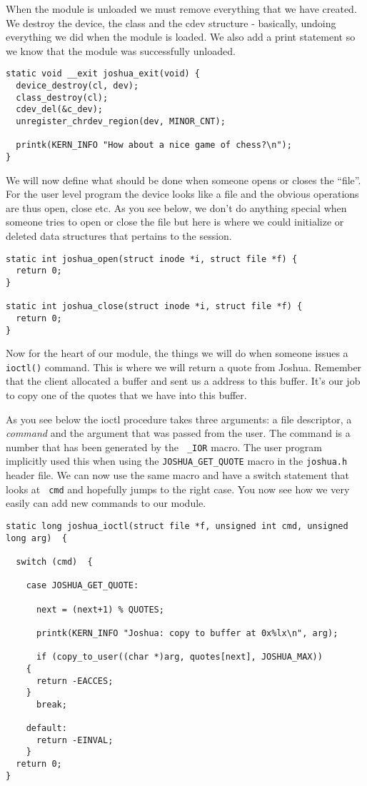 \documentclass[a4paper,11pt]{article}
\begin{document}
When the module is unloaded we must remove everything that we have
created. We destroy the device, the class and the cdev structure -
basically, undoing everything we did when the module is loaded. We
also add a print statement so we know that the module was successfully
unloaded.

\begin{lstlisting}
static void __exit joshua_exit(void) {
  device_destroy(cl, dev);
  class_destroy(cl);
  cdev_del(&c_dev);
  unregister_chrdev_region(dev, MINOR_CNT);
    
  printk(KERN_INFO "How about a nice game of chess?\n");
}
\end{lstlisting}

We will now define what should be done when someone opens or closes
the ``file''. For the user level program the device looks like a file
and the obvious operations are thus open, close etc. As you see below,
we don't do anything special when someone tries to open or close the
file but here is where we could initialize or deleted data structures
that pertains to the session.

\begin{lstlisting}
static int joshua_open(struct inode *i, struct file *f) {
  return 0;
}

static int joshua_close(struct inode *i, struct file *f) {
  return 0;
}
\end{lstlisting}

Now for the heart of our module, the things we will do when someone
issues a {\tt ioctl()} command. This is where we will return a quote
from Joshua. Remember that the client allocated a buffer and sent us a
address to this buffer. It's our job to copy one of the quotes that
we have into this buffer.

As you see below the ioctl procedure takes three arguments: a file
descriptor, a {\em command} and the argument that was passed from the
user. The command is a number that has been generated by the {\tt
 \_IOR} macro. The user program implicitly used this when using the
{\tt JOSHUA\_GET\_QUOTE} macro in the {\tt joshua.h} header file. We can
now use the same macro and have a switch statement that looks at {\tt
  cmd} and hopefully jumps to the right case. You now see how we very
easily can add new commands to our module.

\begin{lstlisting}
static long joshua_ioctl(struct file *f, unsigned int cmd, unsigned long arg)  {

  switch (cmd)  {

    case JOSHUA_GET_QUOTE:

      next = (next+1) % QUOTES;

      printk(KERN_INFO "Joshua: copy to buffer at 0x%lx\n", arg);
     
      if (copy_to_user((char *)arg, quotes[next], JOSHUA_MAX))
	{
	  return -EACCES;
	}
      break;

    default:
      return -EINVAL;
    }
  return 0;
}
\end{lstlisting}
\end{document}
